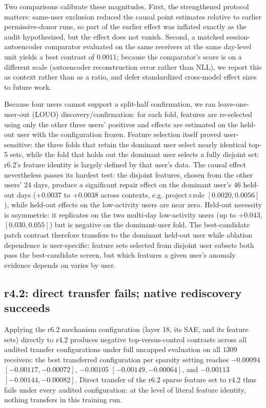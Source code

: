 \documentclass[10pt]{article} %
\newcommand{\rsix}{r6.2}
\newcommand{\rfour}{r4.2}
\begin{document}
Two comparisons calibrate these magnitudes. First, the strengthened protocol
matters: same-user exclusion reduced the causal point estimates relative to
earlier permissive-donor runs, so part of the earlier effect was inflated
exactly as the audit hypothesized, but the effect does not vanish. Second, a matched session-autoencoder comparator evaluated on the same
receivers at the same day-level unit yields a best contrast of $0.0011$;
because the comparator's score is on a different scale (autoencoder
reconstruction error rather than NLL), we report this as context rather than
as a ratio, and defer standardized cross-model effect sizes to future work.

Because four users cannot support a split-half confirmation, we ran
leave-one-user-out (LOUO) discovery/confirmation: for each fold, features are
re-selected using only the other three users' positives and effects are
estimated on the held-out user with the configuration frozen. Feature
selection itself proved user-sensitive: the three folds that retain the
dominant user select nearly identical top-5 sets, while the fold that holds
out the dominant user selects a fully disjoint set: \rsix{}'s feature
identity is largely defined by that user's data. The causal effect
nevertheless passes its hardest test: the disjoint features, chosen from the
other users' $24$ days, produce a significant repair effect on the dominant
user's $46$ held-out days ($+0.0037$ to $+0.0038$ across contexts, e.g.
project$\times$role $[0.0020, 0.0056]$), while held-out effects on the
low-activity users are near zero. Held-out necessity is asymmetric: it
replicates on the two multi-day low-activity users (up to $+0.043$,
$[0.030, 0.055]$) but is negative on the dominant-user fold. The
best-candidate patch contrast therefore transfers to the dominant held-out
user while ablation dependence is user-specific: feature sets selected from
disjoint user subsets both pass the best-candidate screen, but which features
a given user's anomaly evidence depends on varies by user.

\subsection{\rfour{}: direct transfer fails; native rediscovery succeeds}
\label{sec:r42}

Applying the \rsix{} mechanism configuration (layer 18, its SAE, and its
feature sets) directly to \rfour{} produces negative top-versus-control
contrasts across all audited transfer configurations under full uncapped
evaluation on all $1309$ receivers: the best transferred configuration per
sparsity setting reaches $-0.00094$ $[-0.00117, -0.00072]$,
$-0.00105$ $[-0.00149, -0.00064]$, and $-0.00113$ $[-0.00144, -0.00082]$.
Direct transfer of the \rsix{} sparse feature set to \rfour{} thus fails
under every audited configuration: at the level of literal feature identity,
nothing transfers in this training run.
\end{document}

